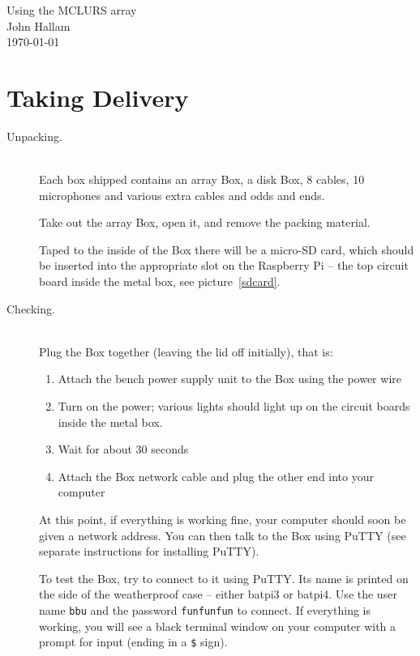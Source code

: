 \documentclass[12pt]{article}
\begin{document}
\begin{center}
\large Using the MCLURS array  \\[5mm]

\footnotesize John Hallam \\[5mm] 
\today \\[5mm]
\end{center}

\section{Taking Delivery}

\begin{description}
\item[Unpacking.] ~\\

  Each box shipped contains an array Box, a disk Box, 8 cables, 10
  microphones and various extra cables and odds and ends.

  Take out the array Box, open it, and remove the packing material.

  Taped to the inside of the Box there will be a micro-SD card, which
  should be inserted into the appropriate slot on the Raspberry Pi --
  the top circuit board inside the metal box, see
  picture~\ref{sdcard}.

\item[Checking.] ~\\

  Plug the Box together (leaving the lid off initially), that is:

  \begin{enumerate}
  \item  Attach the bench power supply unit to the Box using the power wire

  \item  Turn on the power;  various lights should light up on the circuit boards
       inside the metal box.

  \item  Wait for about 30 seconds

  \item  Attach the Box network cable and plug the other end into your computer
  \end{enumerate}

  At this point, if everything is working fine, your computer should
  soon be given a network address.  You can then talk to the Box using
  PuTTY (see separate instructions for installing PuTTY).

  To test the Box, try to connect to it using PuTTY.  Its name is
  printed on the side of the weatherproof case -- either batpi3 or
  batpi4.  Use the user name \texttt{bbu} and the password
  \texttt{funfunfun} to connect.  If everything is working, you will
  see a black terminal window on your computer with a prompt for input
  (ending in a \texttt{\$} sign).


\end{description}
\end{document}
